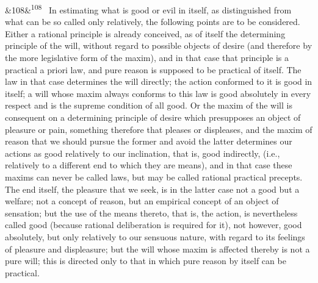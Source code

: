 \documentclass[12pt]{article}
\newcommand{\para}[1][]{\par\noindent\ifx&#1&\else\textsuperscript{\footnotesize #1}~\fi}
\begin{document}
\para[108] In estimating what is good or evil in itself, as distinguished from what can be so called only relatively, the following points are to be considered. Either a rational principle is already conceived, as of itself the determining principle of the will, without regard to possible objects of desire (and therefore by the more legislative form of the maxim), and in that case that principle is a practical a priori law, and pure reason is supposed to be practical of itself. The law in that case determines the will directly; the action conformed to it is good in itself; a will whose maxim always conforms to this law is good absolutely in every respect and is the supreme condition of all good. Or the maxim of the will is consequent on a determining principle of desire which presupposes an object of pleasure or pain, something therefore that pleases or displeases, and the maxim of reason that we should pursue the former and avoid the latter determines our actions as good relatively to our inclination, that is, good indirectly, (i.e., relatively to a different end to which they are means), and in that case these maxims can never be called laws, but may be called rational practical precepts. The end itself, the pleasure that we seek, is in the latter case not a good but a welfare; not a concept of reason, but an empirical concept of an object of sensation; but the use of the means thereto, that is, the action, is nevertheless called good (because rational deliberation is required for it), not however, good absolutely, but only relatively to our sensuous nature, with regard to its feelings of pleasure and displeasure; but the will whose maxim is affected thereby is not a pure will; this is directed only to that in which pure reason by itself can be practical.
\end{document}
